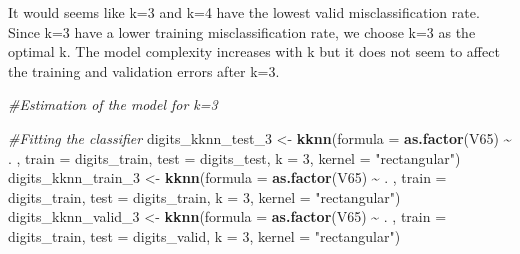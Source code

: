 \documentclass[
]{article}
\newenvironment{Shaded}{\begin{snugshade}}{\end{snugshade}}
\newcommand{\AttributeTok}[1]{\textcolor[rgb]{0.13,0.29,0.53}{#1}}
\newcommand{\CommentTok}[1]{\textcolor[rgb]{0.56,0.35,0.01}{\textit{#1}}}
\newcommand{\DecValTok}[1]{\textcolor[rgb]{0.00,0.00,0.81}{#1}}
\newcommand{\FunctionTok}[1]{\textcolor[rgb]{0.13,0.29,0.53}{\textbf{#1}}}
\newcommand{\NormalTok}[1]{#1}
\newcommand{\OtherTok}[1]{\textcolor[rgb]{0.56,0.35,0.01}{#1}}
\newcommand{\SpecialCharTok}[1]{\textcolor[rgb]{0.81,0.36,0.00}{\textbf{#1}}}
\newcommand{\StringTok}[1]{\textcolor[rgb]{0.31,0.60,0.02}{#1}}
\begin{document}
It would seems like k=3 and k=4 have the lowest valid misclassification
rate. Since k=3 have a lower training misclassification rate, we choose
k=3 as the optimal k. The model complexity increases with k but it does
not seem to affect the training and validation errors after k=3.

\begin{Shaded}
\begin{Highlighting}[]
\CommentTok{\#Estimation of the model for k=3}

\CommentTok{\#Fitting the classifier}
\NormalTok{digits\_kknn\_test\_3 }\OtherTok{\textless{}{-}} \FunctionTok{kknn}\NormalTok{(}\AttributeTok{formula =} \FunctionTok{as.factor}\NormalTok{(V65) }\SpecialCharTok{\textasciitilde{}}\NormalTok{ . , }\AttributeTok{train =}\NormalTok{ digits\_train, }\AttributeTok{test =}\NormalTok{ digits\_test, }\AttributeTok{k =} \DecValTok{3}\NormalTok{, }\AttributeTok{kernel =} \StringTok{"rectangular"}\NormalTok{)}
\NormalTok{digits\_kknn\_train\_3 }\OtherTok{\textless{}{-}} \FunctionTok{kknn}\NormalTok{(}\AttributeTok{formula =} \FunctionTok{as.factor}\NormalTok{(V65) }\SpecialCharTok{\textasciitilde{}}\NormalTok{ . , }\AttributeTok{train =}\NormalTok{ digits\_train, }\AttributeTok{test =}\NormalTok{ digits\_train, }\AttributeTok{k =} \DecValTok{3}\NormalTok{, }\AttributeTok{kernel =} \StringTok{"rectangular"}\NormalTok{)}
\NormalTok{digits\_kknn\_valid\_3 }\OtherTok{\textless{}{-}} \FunctionTok{kknn}\NormalTok{(}\AttributeTok{formula =} \FunctionTok{as.factor}\NormalTok{(V65) }\SpecialCharTok{\textasciitilde{}}\NormalTok{ . , }\AttributeTok{train =}\NormalTok{ digits\_train, }\AttributeTok{test =}\NormalTok{ digits\_valid, }\AttributeTok{k =} \DecValTok{3}\NormalTok{, }\AttributeTok{kernel =} \StringTok{"rectangular"}\NormalTok{)}


\end{Highlighting}
\end{Shaded}
\end{document}
